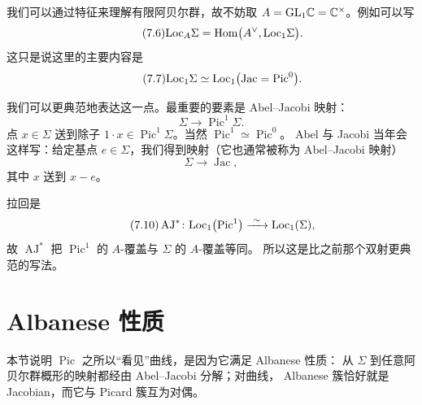 我们可以通过特征来理解有限阿贝尔群，故不妨取 $A=\mathrm{GL}_1\mathbb{C}=\mathbb{C}^{\times}$。例如可以写
\begin{equation}\tag{7.6}\label{eq:7.6}
\mathrm{Loc}_A\Sigma=\mathrm{Hom}\bigl(A^{\vee},\mathrm{Loc}_1\Sigma\bigr).
\end{equation}
这只是说这里的主要内容是
\begin{equation}\tag{7.7}\label{eq:7.7}
\mathrm{Loc}_1\Sigma\simeq\mathrm{Loc}_1\bigl(\operatorname{Jac}=\operatorname{Pic}^0\bigr).
\end{equation}

我们可以更典范地表达这一点。最重要的要素是 Abel--Jacobi 映射：
\begin{equation}\tag{7.8}\label{eq:7.8}
\Sigma\to\operatorname{Pic}^1\Sigma .
\end{equation}
点 $x\in\Sigma$ 送到除子 $1\cdot x\in\operatorname{Pic}^1\Sigma$。当然 $\operatorname{Pic}^1\simeq\operatorname{Pic}^0$。
Abel 与 Jacobi 当年会这样写：给定基点 $e\in\Sigma$，我们得到映射（它也通常被称为
Abel--Jacobi 映射）
\begin{equation}\tag{7.9}\label{eq:7.9}
\Sigma\to\operatorname{Jac},
\end{equation}
其中 $x$ 送到 $x-e$。

拉回是
\begin{equation}\tag{7.10}\label{eq:7.10}
\operatorname{AJ}^*\colon\mathrm{Loc}_1\bigl(\operatorname{Pic}^1\bigr)
\xrightarrow{\ \sim\ }\mathrm{Loc}_1(\Sigma),
\end{equation}
故 $\operatorname{AJ}^*$ 把 $\operatorname{Pic}^1$ 的 $A$-覆盖与 $\Sigma$ 的 $A$-覆盖等同。
所以这是比之前那个双射更典范的写法。


\section{Albanese 性质}

\begin{sectionkey}
本节说明 $\operatorname{Pic}$ 之所以“看见”曲线，是因为它满足 Albanese 性质：
从 $\Sigma$ 到任意阿贝尔群概形的映射都经由 Abel--Jacobi 分解；对曲线，
Albanese 簇恰好就是 Jacobian，而它与 Picard 簇互为对偶。
\end{sectionkey}

